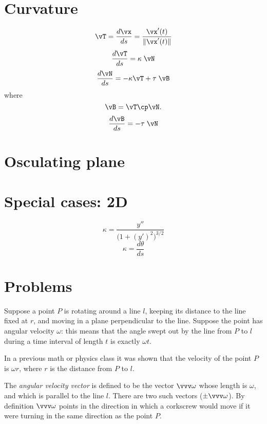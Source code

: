 \section{Curvature} %
\begin{equation}
  \vT = \frac{d\vx}{ds} = \frac{\vx'(t)}{\|\vx'(t)\|}
  \label{eq:unit-tangent-def}
\end{equation}
\begin{equation}
  \frac{d\vT}{ds} = \kappa\; \vN
  \label{eq:first-Serret-Frenet}
\end{equation}
\begin{equation}
  \frac{d\vN}{ds} = -\kappa\vT + \tau\; \vB
  \label{eq:second-Serret-Frenet}
\end{equation}
where
\[
\vB= \vT\cp\vN.
\]
\begin{equation}
  \frac{d\vB}{ds} = -\tau\; \vN
  \label{eq:third-Serret-Frenet}
\end{equation}

\section{Osculating plane} %

\section{Special cases: 2D} %
\begin{equation}
  \kappa = \frac{y''}{\bigl(1+(y')^2\bigr)^{3/2}}
  \label{eq:curvature-of-graph}
\end{equation}
\begin{equation}
  \kappa = \frac{d\theta}{ds}
  \label{eq:curvature-is-deriv-of-tangentangle}
\end{equation}
\section{Problems} %
\problemfont
\problem Suppose a point $P$ is rotating around a line $l$, keeping%
its distance to the line fixed at $r$, and moving in a plane
perpendicular to the line.  Suppose the point has angular velocity
$\omega$: this means that the angle swept out by the line from $P$ to
$l$ during a time interval of length $t$ is exactly $\omega t$.

In a previous math or physics class it was shown that the velocity of
the point $P$ is $\omega r$, where $r$ is the distance from $P$ to
$l$.

The \emph{angular velocity vector} is defined to be the vector
$\vvv\omega$ whose length is $\omega$, and which is parallel to the
line $l$.  There are two such vectors ($\pm \vvv\omega$).  By
definition $\vvv\omega$ points in the direction in which a corkscrew
would move if it were turning in the same direction as the point $P$.

